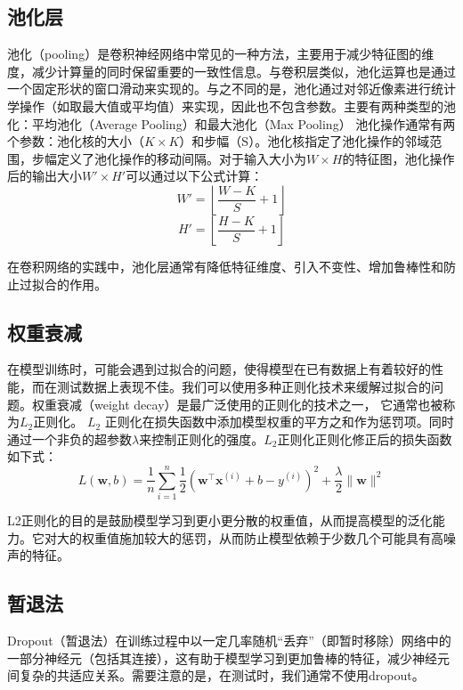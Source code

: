 \subsection{池化层}
池化（pooling）\cite{2022ComparisonPoolingMethodsConvolutionalNeuralNetworks}是卷积神经网络中常见的一种方法，主要用于减少特征图的维度，减少计算量的同时保留重要的一致性信息。与卷积层类似，池化运算也是通过一个固定形状的窗口滑动来实现的。与之不同的是，池化通过对邻近像素进行统计学操作（如取最大值或平均值）来实现，因此也不包含参数。主要有两种类型的池化：平均池化（Average Pooling）\cite{2022ComparisonPoolingMethodsConvolutionalNeuralNetworks}和最大池化（Max Pooling）\cite{2011Maxpoolingconvolutionalneuralnetworksvisionbasedhandgesturerecognition}
池化操作通常有两个参数：池化核的大小（\(K \times K\)）和步幅（S）。池化核指定了池化操作的邻域范围，步幅定义了池化操作的移动间隔。对于输入大小为$W \times H$的特征图，池化操作后的输出大小$W' \times H'$可以通过以下公式计算：
\begin{equation}
  W' = \left\lfloor\frac{W - K}{S} + 1\right\rfloor
\end{equation}
\begin{equation}
  H' = \left\lfloor\frac{H - K}{S} + 1\right\rfloor
\end{equation}

在卷积网络的实践中，池化层通常有降低特征维度、引入不变性、增加鲁棒性和防止过拟合的作用。

\subsection{权重衰减}
在模型训练时，可能会遇到过拟合的问题，使得模型在已有数据上有着较好的性能，而在测试数据上表现不佳。我们可以使用多种正则化技术来缓解过拟合的问题。权重衰减（weight decay）是最广泛使用的正则化的技术之一， 它通常也被称为$L_2$正则化。
$L_2$ 正则化在损失函数中添加模型权重的平方之和作为惩罚项。同时通过一个非负的超参数$\lambda$来控制正则化的强度。$L_2$正则化正则化修正后的损失函数如下式：
\begin{equation}
  L(\mathbf{w}, b)=\frac{1}{n} \sum_{i=1}^{n} \frac{1}{2}\left(\mathbf{w}^{\top} \mathbf{x}^{(i)}+b-y^{(i)}\right)^{2}+\frac{\lambda}{2}\|\mathbf{w}\|^{2}
\end{equation}

L2正则化的目的是鼓励模型学习到更小更分散的权重值，从而提高模型的泛化能力。它对大的权重值施加较大的惩罚，从而防止模型依赖于少数几个可能具有高噪声的特征。

\subsection{暂退法}
Dropout（暂退法）\cite{wu2021r}在训练过程中以一定几率随机“丢弃”（即暂时移除）网络中的一部分神经元（包括其连接），这有助于模型学习到更加鲁棒的特征，减少神经元间复杂的共适应关系。需要注意的是，在测试时，我们通常不使用dropout。
